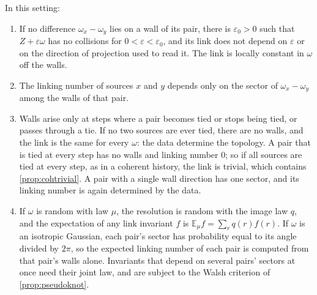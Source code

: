 \documentclass[11pt]{article}
\theoremstyle{definition}\newtheorem{definition}[theorem]{Definition}\newtheorem{remark}[theorem]{Remark}\newtheorem{example}[theorem]{Example}\newtheorem{problem}[theorem]{Open problem}\crefname{problem}{Problem}{Problems}
\begin{document}
\begin{proposition}\label{prop:tiebridge}
In this setting:
\begin{enumerate}
\item[(i)] If no difference $\omega_x-\omega_y$ lies on a wall of its pair, there is $\varepsilon_0>0$ such that $Z+\varepsilon\omega$ has no collisions for $0<\varepsilon<\varepsilon_0$, and its link does not depend on $\varepsilon$ or on the direction of projection used to read it. The link is locally constant in $\omega$ off the walls.
\item[(ii)] The linking number of sources $x$ and $y$ depends only on the sector of $\omega_x-\omega_y$ among the walls of that pair.
\item[(iii)] Walls arise only at steps where a pair becomes tied or stops being tied, or passes through a tie. If no two sources are ever tied, there are no walls, and the link is the same for every $\omega$: the data determine the topology. A pair that is tied at every step has no walls and linking number $0$; so if all sources are tied at every step, as in a coherent history, the link is trivial, which contains \cref{prop:cohtrivial}. A pair with a single wall direction has one sector, and its linking number is again determined by the data.
\item[(iv)] If $\omega$ is random with law $\mu$, the resolution is random with the image law $q$, and the expectation of any link invariant $f$ is $\mathbb E_\mu f=\sum_rq(r)f(r)$. If $\omega$ is an isotropic Gaussian, each pair's sector has probability equal to its angle divided by $2\pi$, so the expected linking number of each pair is computed from that pair's walls alone. Invariants that depend on several pairs' sectors at once need their joint law, and are subject to the Walsh criterion of \cref{prop:pseudoknot}.
\end{enumerate}
\end{proposition}
\end{document}
